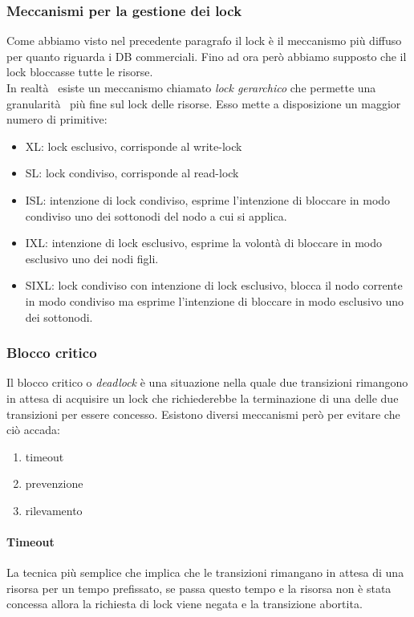 \subsubsection{Meccanismi per la gestione dei lock}
Come abbiamo visto nel precedente paragrafo il lock è il meccanismo più diffuso per quanto riguarda i DB commerciali. Fino ad ora però abbiamo supposto che il lock bloccasse tutte le risorse.\\
In realtà  esiste un meccanismo chiamato \emph{lock gerarchico} che permette una granularità  più fine sul lock delle risorse. Esso mette a disposizione un maggior numero di primitive:
\begin{itemize}
\item XL: lock esclusivo, corrisponde al write-lock
\item SL: lock condiviso, corrisponde al read-lock
\item ISL: intenzione di lock condiviso, esprime l'intenzione di bloccare in modo condiviso uno dei sottonodi del nodo a cui si applica.
\item IXL: intenzione di lock esclusivo, esprime la volontà di bloccare in modo esclusivo uno dei nodi figli.
\item SIXL: lock condiviso con intenzione di lock esclusivo, blocca il nodo corrente in modo condiviso ma esprime l'intenzione di bloccare in modo esclusivo uno dei sottonodi.
\end{itemize}
\subsubsection{Blocco critico}
Il blocco critico o \emph{deadlock} è una situazione nella quale due transizioni rimangono in attesa di acquisire un lock che richiederebbe la terminazione di una delle due transizioni per essere concesso.
Esistono diversi meccanismi però per evitare che ciò accada:
\begin{enumerate}
\item timeout
\item prevenzione
\item rilevamento
\end{enumerate}
\paragraph{Timeout} La tecnica più semplice che implica che le transizioni rimangano in attesa di una risorsa per un tempo prefissato, se passa questo tempo e la risorsa non è stata concessa allora la richiesta di lock viene negata e la transizione abortita.
